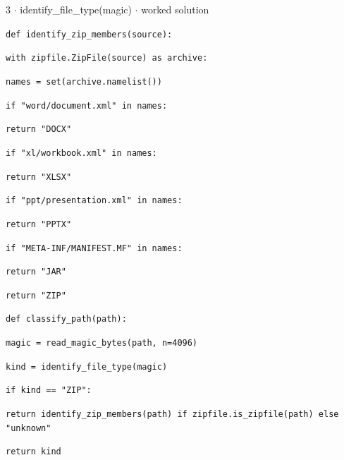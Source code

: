 \documentclass[11pt]{article}
\begin{document}
\begin{keepsection}
\begin{workedbox}{3 \ensuremath{\cdot} identify\_file\_type(magic) \ensuremath{\cdot} worked solution}
\begin{enumerate}
\begin{tcolorbox}[colback=Paperblue,colframe=Paperblue,boxrule=0pt,arc=0pt,left=7pt,right=7pt,top=5pt,bottom=5pt]
\noindent\hspace*{0em}\texttt{def identify\_zip\_members(source):}\par
\noindent\hspace*{1em}\texttt{with zipfile.ZipFile(source) as archive:}\par
\noindent\hspace*{3em}\texttt{names = set(archive.namelist())}\par
\noindent\hspace*{1em}\texttt{if "word/document.xml" in names:}\par
\noindent\hspace*{3em}\texttt{return "DOCX"}\par
\noindent\hspace*{1em}\texttt{if "xl/workbook.xml" in names:}\par
\noindent\hspace*{3em}\texttt{return "XLSX"}\par
\noindent\hspace*{1em}\texttt{if "ppt/presentation.xml" in names:}\par
\noindent\hspace*{3em}\texttt{return "PPTX"}\par
\noindent\hspace*{1em}\texttt{if "META-INF/MANIFEST.MF" in names:}\par
\noindent\hspace*{3em}\texttt{return "JAR"}\par
\noindent\hspace*{1em}\texttt{return "ZIP"}\par
\noindent\hspace*{0em}\texttt{}\par
\noindent\hspace*{0em}\texttt{def classify\_path(path):}\par
\noindent\hspace*{1em}\texttt{magic = read\_magic\_bytes(path, n=4096)}\par
\noindent\hspace*{1em}\texttt{kind = identify\_file\_type(magic)}\par
\noindent\hspace*{1em}\texttt{if kind == "ZIP":}\par
\noindent\hspace*{3em}\texttt{return identify\_zip\_members(path) if zipfile.is\_zipfile(path) else "unknown"}\par
\noindent\hspace*{1em}\texttt{return kind}\par
\end{tcolorbox}
\end{enumerate}
\end{workedbox}

\end{keepsection}
\end{document}
